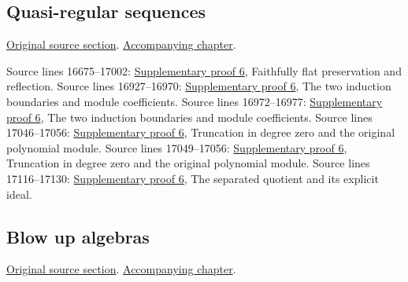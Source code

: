\subsection{Quasi-regular sequences}
\hypertarget{algebra-source-section-quasi-regular}{}
\noindent\href{https://github.com/stacks/stacks-project/blob/a04446e57ec1fbc252a871afcec7752fb2807b14/algebra.tex\#L16855}{Original source section}. \href{algebra.pdf\#nameddest=section-quasi-regular}{Accompanying chapter}.

\begin{AlgebraSourceRoutes}
 Source lines 16675--17002: \hyperlink{algebra_embedded_regular_notes_20260927}{Supplementary proof 6}, Faithfully flat preservation and reflection.
 Source lines 16927--16970: \hyperlink{algebra_embedded_regular_notes_20260927}{Supplementary proof 6}, The two induction boundaries and module coefficients.
 Source lines 16972--16977: \hyperlink{algebra_embedded_regular_notes_20260927}{Supplementary proof 6}, The two induction boundaries and module coefficients.
 Source lines 17046--17056: \hyperlink{algebra_embedded_regular_notes_20260927}{Supplementary proof 6}, Truncation in degree zero and the original polynomial module.
 Source lines 17049--17056: \hyperlink{algebra_embedded_regular_notes_20260927}{Supplementary proof 6}, Truncation in degree zero and the original polynomial module.
 Source lines 17116--17130: \hyperlink{algebra_embedded_regular_notes_20260927}{Supplementary proof 6}, The separated quotient and its explicit ideal.
\end{AlgebraSourceRoutes}

\subsection{Blow up algebras}
\hypertarget{algebra-source-section-blow-up}{}
\noindent\href{https://github.com/stacks/stacks-project/blob/a04446e57ec1fbc252a871afcec7752fb2807b14/algebra.tex\#L17136}{Original source section}. \href{algebra.pdf\#nameddest=section-blow-up}{Accompanying chapter}.

